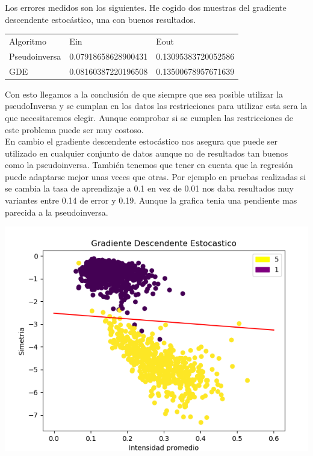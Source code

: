 \documentclass[titlepage]{article}
\begin{document}
	Los errores medidos son los siguientes. He cogido dos muestras del gradiente descendente estocástico, una con buenos resultados.
	\begin{center}
		\begin{tabular}{lll}
			Algoritmo & Ein & Eout \\
			Pseudoinversa   & 0.07918658628900431  & 0.13095383720052586   \\
			GDE     & 0.08160387220196508  &  0.13500678957671639 
		\end{tabular}	
	\end{center}

	Con esto llegamos a la conclusión de que siempre que sea posible utilizar la pseudoInversa y se cumplan en los datos las restricciones para utilizar esta sera la que necesitaremos elegir. Aunque comprobar si se cumplen las restricciones de este problema puede ser muy costoso.\\
	En cambio el gradiente descendente estocástico nos asegura que puede ser utilizado en cualquier conjunto de datos aunque no de resultados tan buenos como la pseudoinversa. También tenemos que tener en cuenta que la regresión puede adaptarse mejor unas veces que otras.
	Por ejemplo en pruebas realizadas si se cambia la tasa de aprendizaje a 0.1 en vez de 0.01 nos daba resultados muy variantes entre 0.14 de error y 0.19. Aunque la grafica tenia una pendiente mas parecida a la pseudoinversa.
	
	\begin{center}
		\includegraphics[scale=0.5]{gdeTasaGrande.png}
	\end{center}
\end{document}
